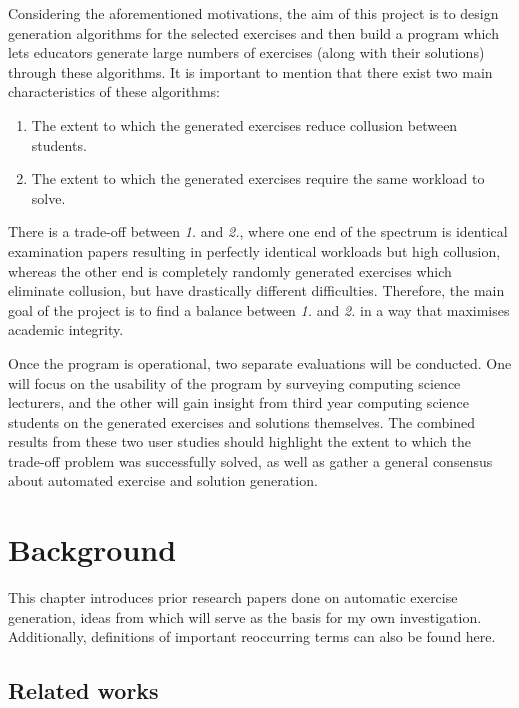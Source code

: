 \documentclass{l4proj}
\begin{document}
Considering the aforementioned motivations, the aim of this project is to design generation algorithms for the selected exercises and then build a program which lets educators generate large numbers of exercises (along with their solutions) through these algorithms. It is important to mention that there exist two main characteristics of these algorithms:
\begin{enumerate}
	\item
	The extent to which the generated exercises reduce collusion between students.
	\item
	The extent to which the generated exercises require the same workload to solve.
\end{enumerate}
There is a trade-off between \emph{1.} and \emph{2.}, where one end of the spectrum is identical examination papers resulting in perfectly identical workloads but high collusion, whereas the other end is completely randomly generated exercises which eliminate collusion, but have drastically different difficulties. Therefore, the main goal of the project is to find a balance between \emph{1.} and \emph{2.} in a way that maximises academic integrity.

Once the program is operational, two separate evaluations will be conducted. One will focus on the usability of the program by surveying computing science lecturers, and the other will gain insight from third year computing science students on the generated exercises and solutions themselves. The combined results from these two user studies should highlight the extent to which the trade-off problem was successfully solved, as well as gather a general consensus about automated exercise and solution generation.

\chapter{Background}
\label{chap:back}

This chapter introduces prior research papers done on automatic exercise generation, ideas from which will serve as the basis for my own investigation. Additionally, definitions of important reoccurring terms can also be found here.

\section{Related works}
\end{document}
